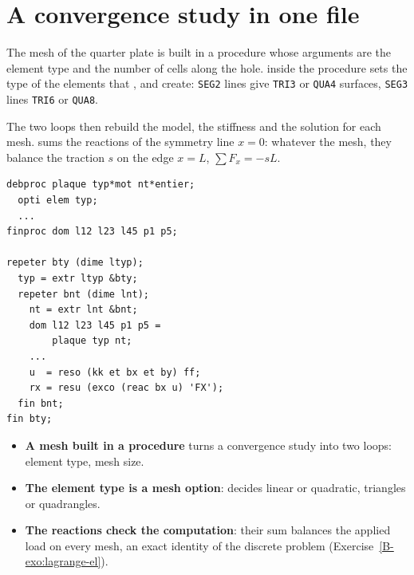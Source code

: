 \section{A convergence study in one file}\label{cc:sec2-loop}
%
\begin{castemcom}
The mesh of the quarter plate is built in a procedure whose arguments are the
element type and the number of cells along the hole.  inside
the procedure sets the type of the elements that ,  and
 create: \texttt{SEG2} lines give \texttt{TRI3} or \texttt{QUA4}
surfaces, \texttt{SEG3} lines \texttt{TRI6} or \texttt{QUA8}.

The two loops then rebuild the model, the stiffness and the solution for each
mesh.  sums the reactions of the symmetry line $x=0$: whatever the
mesh, they balance the traction $s$ on the edge $x=L$, $\sum F_x=-sL$.
\end{castemcom}
\begin{castemlines}
\begin{verbatim}
debproc plaque typ*mot nt*entier;
  opti elem typ;
  ...
finproc dom l12 l23 l45 p1 p5;

repeter bty (dime ltyp);
  typ = extr ltyp &bty;
  repeter bnt (dime lnt);
    nt = extr lnt &bnt;
    dom l12 l23 l45 p1 p5 =
        plaque typ nt;
    ...
    u  = reso (kk et bx et by) ff;
    rx = resu (exco (reac bx u) 'FX');
  fin bnt;
fin bty;
\end{verbatim}
\end{castemlines}


\begin{gbox*}
\begin{itemize}
\item \textbf{A mesh built in a procedure} turns a convergence study into two
  loops: element type, mesh size.
\item \textbf{The element type is a mesh option}:  decides
  linear or quadratic, triangles or quadrangles.
\item \textbf{The reactions check the computation}: their sum balances the
  applied load on every mesh, an exact identity of the discrete problem
  (Exercise~\ref{B-exo:lagrange-el}).
\end{itemize}
\end{gbox*}


